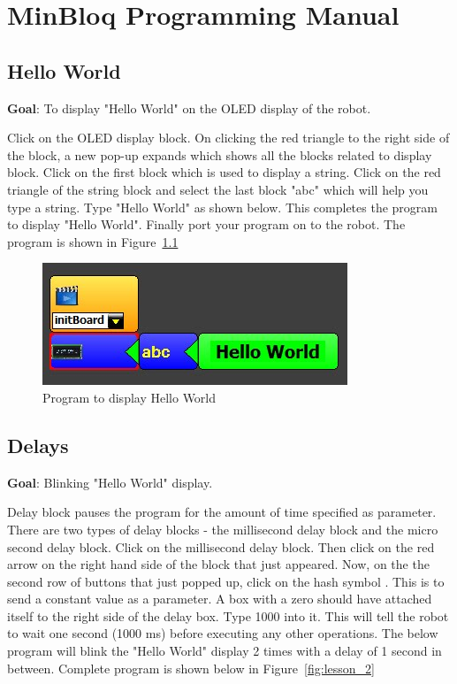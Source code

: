 
\chapter{MinBloq Programming Manual}\label{apdx:a}

\section{Hello World}

\textbf{Goal}: To display "Hello World" on the OLED display of the robot.

Click on the OLED display block. On clicking the red triangle to the right side of the block, a new pop-up expands which shows all the blocks related to display block. Click on the first block which is used to display a string. Click on the red triangle of the string block and select the last block "abc" which will help you type a string. Type "Hello World" as shown below. This completes the program to display "Hello World". Finally  port your program on to the robot. The program is shown in Figure~\ref{fig:lesson_1}

\begin{figure}[h]
\centering
\includegraphics[width=0.35\columnwidth]{Images/Manual/lesson_1}
\caption{Program to display Hello World}
\label{fig:lesson_1}
\end{figure}

\section{Delays}

\textbf{Goal}: Blinking "Hello World" display.

Delay block pauses the program for the amount of time specified as parameter. There are two types of delay blocks - the millisecond delay block and the micro second delay block. Click on the millisecond delay block. Then click on the red arrow on the right hand side of the block that just appeared. Now, on the the second row of buttons that just popped up, click on the hash symbol . This is to send a constant value as a parameter. A box with a zero should have attached itself to the right side of the delay box. Type 1000 into it. This will tell the robot to wait one second (1000 ms)  before executing any other operations. The below program will blink the "Hello World" display 2 times with a delay of 1 second in between. Complete program is shown below in Figure~\ref{fig:lesson_2}

